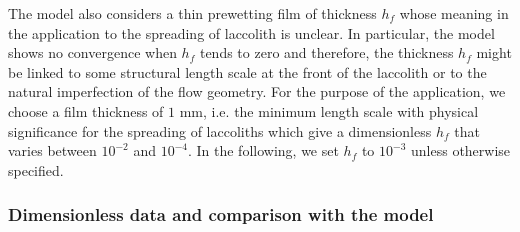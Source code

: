 The model  also considers  a thin prewetting  film of  thickness $h_f$
whose  meaning in  the application  to the  spreading of  laccolith is
unclear.  In  particular, the  model shows  no convergence  when $h_f$
tends to zero \citep{Lister:2013ia} and therefore, the thickness $h_f$
might be  linked to some structural  length scale at the  front of the
laccolith or  to the natural  imperfection of the flow  geometry.  For
the purpose of the application, we  choose a film thickness of $1$ mm,
i.e.   the minimum  length scale  with physical  significance for  the
spreading of laccoliths  which give a dimensionless  $h_f$ that varies
between $10^{-2}$  and $10^{-4}$.  In  the following, we set  $h_f$ to
$10^{-3}$ unless otherwise specified.

\subsubsection*{Dimensionless data and comparison with the model}


